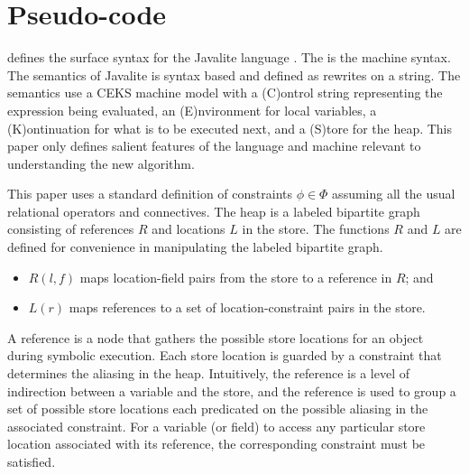 \section{Pseudo-code}
 defines the surface syntax for the
Javalite language \cite{saints-MS}. The  is
the machine syntax. The semantics of Javalite is syntax based and
defined as rewrites on a string. The semantics use a CEKS machine
model with a (C)ontrol string representing the expression being
evaluated, an (E)nvironment for local variables, a (K)ontinuation for
what is to be executed next, and a (S)tore for the heap. This paper
only defines salient features of the language and machine relevant to
understanding the new algorithm.




This paper uses a standard definition of constraints $\phi \in \Phi$
assuming all the usual relational operators and connectives. The heap
is a labeled bipartite graph consisting of references $R$ and
locations $L$ in the store. The functions $R$ and $L$ are defined for convenience
in manipulating the labeled bipartite graph.
\begin{itemize}
\item $R(l,f)$ maps location-field pairs from the store to a reference in $R$; and
\item $L(r)$ maps references to a set of location-constraint pairs in the store.
\end{itemize}
A reference is a node that gathers the possible store locations for an
object during symbolic execution. Each store location is guarded by a
constraint that determines the aliasing in the heap. Intuitively, the
reference is a level of indirection between a variable and the store,
and the reference is used to group a set of possible store locations
each predicated on the possible aliasing in the associated constraint.
For a variable (or field) to access any particular store location
associated with its reference, the corresponding constraint must be
satisfied.

\begin{comment}
 defined on value sets $L$ and references
$R$. $R$ and $L$ include the special symbol $\bot$ to indicate an
uninitialized reference and location respectively. Additionally, $L$
includes a special location $\mathtt{NULL}$ for null references.
\end{comment}

